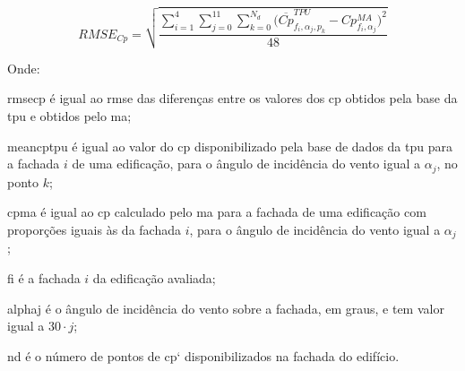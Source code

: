 \documentclass[brazil,hardcopy,openany]{ufscthesis} %
\begin{document}
\begin{equation}
\label{eq:Cpdiff}
RMSE_{Cp} = \sqrt{\frac{\sum_{i=1}^{4}{\sum_{j=0}^{11}}{\sum_{k=0}^{N_d}{(\overline{Cp}^{TPU}_{f_i,\alpha_j,p_k} - Cp^{MA}_{f_i,\alpha_j}})^2}}{48}}
\end{equation}

Onde:

\gls{rmsecp} é igual ao \acrshort{rmse} das diferenças entre os valores dos \acrshort{cp} obtidos pela base da \acrshort{tpu} e obtidos pelo \acrlong{ma};

\gls{meancptpu} é igual ao valor do \acrshort{cp} disponibilizado pela base de dados da \acrshort{tpu} para a fachada $i$ de uma edificação, para o ângulo de incidência do vento igual a $\alpha_j$, no ponto $k$;

\gls{cpma} é igual ao \acrshort{cp} calculado pelo \acrlong{ma} para a fachada de uma edificação com proporções iguais às da fachada $i$, para o ângulo de incidência do vento igual a $\alpha_j$;

\gls{fi} é a fachada $i$ da edificação avaliada;

\gls{alphaj} é o ângulo de incidência do vento  sobre a fachada, em graus, e tem valor igual a $30 \cdot j$;

\gls{nd} é o número de pontos de \acrshort{cp}` disponibilizados na fachada do edifício.	
\\

\end{document}
